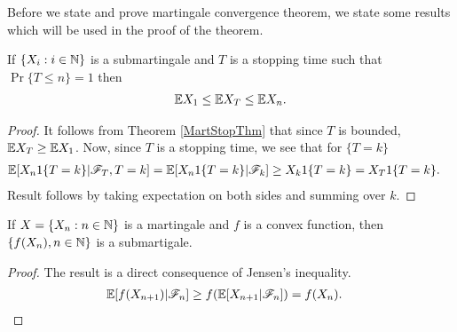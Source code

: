 \documentclass[a4paper,10pt,english]{article}
\begin{document}
Before we state and prove martingale convergence theorem, we state some results which will be used in the proof of the theorem.
\begin{lem}
\label{StoppingTimeBound}
If $\{X_i:  i \in \mathbb{N} \}$ is  a submartingale and $T$ is a stopping time such that $\Pr\{T \leq n\}=1$ then
\begin{align*}
 \mathbb{E} X_1 \leq \mathbb{E} X_T \leq \mathbb{E} X_n.
\end{align*}
\end{lem}
\begin{proof}
It follows from Theorem \ref{MartStopThm} that since $T$ is bounded, $\mathbb{E} X_T  \geq \mathbb{E} X_1$. 
Now, since $T$ is a stopping time, we see that for $\{T = k\}$
\begin{align*}
\E[X_n1\{T = k\}|\F_T,T=k]&= %
\E[X_n1\{T = k\}|\F_k] \geq X_k1\{T = k \} = X_T1\{T = k\}.
\end{align*}
Result follows by taking expectation on both sides and summing over $k$. 
\end{proof}

\begin{lem}
\label{ConvexFuncSubmart}
If $X = \{X_n: n \in \mathbb{N}\}$ is a martingale and $f$ is a convex function, then $\{f(X_n),n \in \mathbb{N}\}$ is a submartigale.
\end{lem}
\begin{proof}
The result is a direct consequence of Jensen's inequality.
\begin{align*}
\mathbb{E}[f(X_{n+1})|\mathscr{F}_n] &\geq f(\mathbb{E}[X_{n+1}|\mathscr{F}_n])=f(X_n).
\end{align*}
\end{proof}
\end{document}
